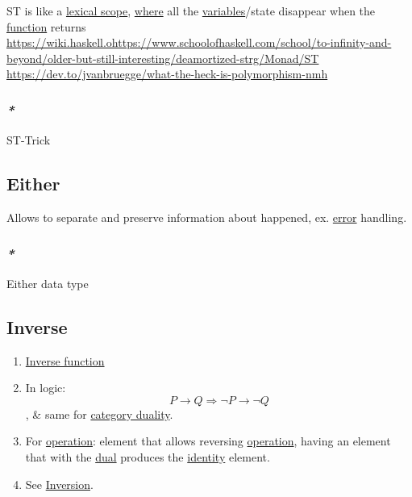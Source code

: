 \documentclass[11pt]{article}
\begin{document}
ST is like a \hyperref[org6a58f4c]{lexical scope}, \hyperref[org3e5903d]{where} all the \hyperref[orge17f54f]{variables}/state disappear when the \hyperref[orge15bc14]{function} returns\\
\url{https://wiki.haskell.ohttps://www.schoolofhaskell.com/school/to-infinity-and-beyond/older-but-still-interesting/deamortized-strg/Monad/ST}\\
\url{https://dev.to/jvanbruegge/what-the-heck-is-polymorphism-nmh}\\

\subsubsection{\emph{*}}
\label{sec:orgc68dec0}

\label{org61f073d}ST-Trick\\

\subsection{\label{org6f16842}Either}
\label{sec:orga513c5d}

Allows to separate and preserve information about happened, ex. \hyperref[org2b27c5e]{error} handling.\\

\subsubsection{\emph{*}}
\label{sec:org02d0d3b}

\label{org3d875bf}Either data type\\

\subsection{\label{org0da4e7e}Inverse}
\label{sec:org06fb536}

\begin{enumerate}
\item \hyperref[org27bfad4]{Inverse function}\\

\item In logic: $$ P \to Q \Rightarrow \neg P \to \neg Q $$, \& same for \hyperref[orga78b2f9]{category duality}.\\

\item For \hyperref[org1173fe8]{operation}: element that allows reversing \hyperref[org1173fe8]{operation}, having an element that with the \hyperref[org28cefbe]{dual} produces the \hyperref[org9b95fd5]{identity} element.\\

\item See \hyperref[org4fe1452]{Inversion}.\\
\end{enumerate}
\end{document}
